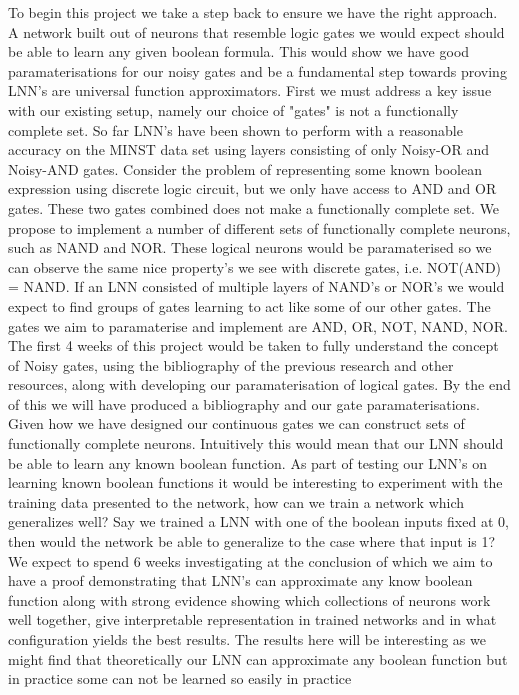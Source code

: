 \documentclass[11pt, a4paper, twoside, openright]{report}
\begin{document}
To begin this project we take a step back to ensure we have the right approach. A network built out of neurons that resemble logic gates we would expect should be able to learn any given boolean formula. This would show we have good paramaterisations for our noisy gates and be a fundamental step towards proving LNN's are universal function approximators. First we must address a key issue with our existing setup, namely our choice of "gates" is not a functionally complete set. So far LNN's have been shown to perform with a reasonable accuracy on the MINST data set using layers consisting of only Noisy-OR and Noisy-AND gates. Consider the problem of representing some known boolean expression using discrete logic circuit, but we only have access to AND and OR gates. These two gates combined does not make a functionally complete set. We propose to implement a number of different sets of functionally complete neurons, such as NAND and NOR. These logical neurons would be paramaterised so we can observe the same nice property's we see with discrete gates, i.e. NOT(AND) = NAND. If an LNN consisted of multiple layers of NAND's or NOR's we would expect to find groups of gates learning to act like some of our other gates. The gates we aim to paramaterise and implement are AND, OR, NOT, NAND, NOR. \\

The first 4 weeks of this project would be taken to fully understand the concept of Noisy gates, using the bibliography of the previous research and other resources, along with developing our paramaterisation of logical gates. By the end of this we will have produced a bibliography and our gate paramaterisations.\\

Given how we have designed our continuous gates we can construct sets of functionally complete neurons. Intuitively this would mean that our LNN should be able to learn any known boolean function. As part of testing our LNN's on learning known boolean functions it would be interesting to experiment with the training data presented to the network, how can we train a network which generalizes well? Say we trained a LNN with one of the boolean inputs fixed at 0, then would the network be able to generalize to the case where that input is 1? We expect to spend 6 weeks investigating at the conclusion of which we aim to have a proof demonstrating that LNN's can approximate any know boolean function along with strong evidence showing which collections of neurons work well together, give interpretable representation in trained networks and in what configuration yields the best results. The results here will be interesting as we might find that theoretically our LNN can approximate any boolean function but in practice some can not be learned so easily in practice\\
\end{document}
